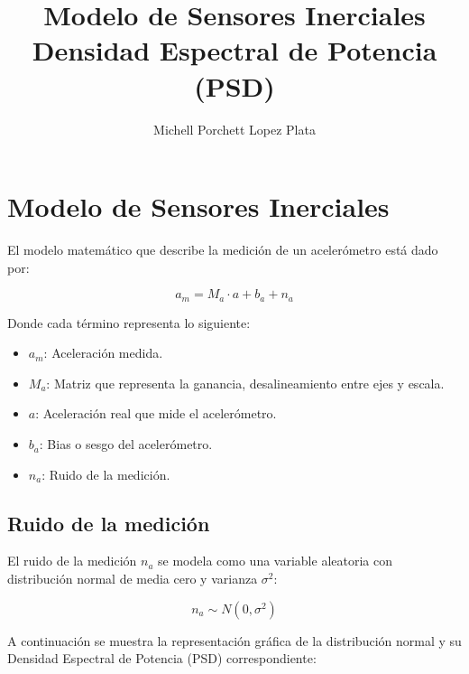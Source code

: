 \documentclass[12pt]{article}
\title{\textbf{Modelo de Sensores Inerciales} \\ \large Densidad Espectral de Potencia (PSD)}
\author{Michell Porchett Lopez Plata}
\date{}
\begin{document}
 
\maketitle
 
\section{Modelo de Sensores Inerciales}
 
El modelo matemático que describe la medición de un acelerómetro está dado por:
 
\begin{equation}
    a_m = M_a \cdot a + b_a + n_a
\end{equation}
 
Donde cada término representa lo siguiente:
 
\begin{itemize}
    \item $a_m$: Aceleración medida.
    \item $M_a$: Matriz que representa la ganancia, desalineamiento entre ejes y escala.
    \item $a$: Aceleración real que mide el acelerómetro.
    \item $b_a$: Bias o sesgo del acelerómetro.
    \item $n_a$: Ruido de la medición.
\end{itemize}
 
\subsection{Ruido de la medición}
 
El ruido de la medición $n_a$ se modela como una variable aleatoria con distribución normal de media cero y varianza $\sigma^2$:
 
\begin{equation}
    n_a \sim N(0, \sigma^2)
\end{equation}
 
A continuación se muestra la representación gráfica de la distribución normal y su Densidad Espectral de Potencia (PSD) correspondiente:
 
\end{document}
